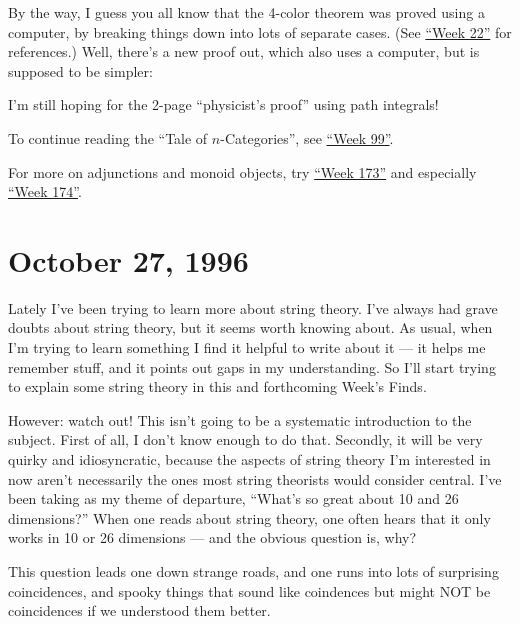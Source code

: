 \documentclass{article}
\def\tightlist{}
\renewcommand{\texttt}[1]{%
  \begingroup
  \ttfamily
  \begingroup\lccode`~=`/\lowercase{\endgroup\def~}{/\discretionary{}{}{}}%
  \begingroup\lccode`~=`[\lowercase{\endgroup\def~}{[\discretionary{}{}{}}%
  \begingroup\lccode`~=`.\lowercase{\endgroup\def~}{.\discretionary{}{}{}}%
  \catcode`/=\active\catcode`[=\active\catcode`.=\active
  \scantokens{#1\noexpand}%
  \endgroup
}
\begin{document}
By the way, I guess you all know that the 4-color theorem was proved
using a computer, by breaking things down into lots of separate cases.
(See \protect\hyperlink{week22}{``Week 22''} for references.) Well,
there's a new proof out, which also uses a computer, but is supposed to
be simpler:


I'm still hoping for the 2-page ``physicist's proof'' using path
integrals!

To continue reading the ``Tale of \(n\)-Categories'', see
\protect\hyperlink{week99}{``Week 99''}.

For more on adjunctions and monoid objects, try
\protect\hyperlink{week173}{``Week 173''} and especially
\protect\hyperlink{week174}{``Week 174''}.
\hypertarget{week93}{%
\section{October 27, 1996}\label{week93}}

Lately I've been trying to learn more about string theory. I've always
had grave doubts about string theory, but it seems worth knowing about.
As usual, when I'm trying to learn something I find it helpful to write
about it --- it helps me remember stuff, and it points out gaps in my
understanding. So I'll start trying to explain some string theory in
this and forthcoming Week's Finds.

However: watch out! This isn't going to be a systematic introduction to
the subject. First of all, I don't know enough to do that. Secondly, it
will be very quirky and idiosyncratic, because the aspects of string
theory I'm interested in now aren't necessarily the ones most string
theorists would consider central. I've been taking as my theme of
departure, ``What's so great about 10 and 26 dimensions?'' When one
reads about string theory, one often hears that it only works in 10 or
26 dimensions --- and the obvious question is, why?

This question leads one down strange roads, and one runs into lots of
surprising coincidences, and spooky things that sound like coindences
but might NOT be coincidences if we understood them better.
\end{document}
